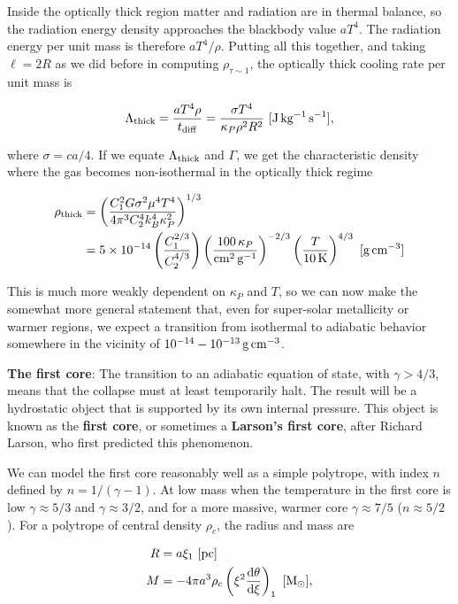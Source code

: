 \documentclass[a4paper,10pt]{article}
\begin{document}
{\noindent}Inside the optically thick region matter and radiation are in thermal balance, so the radiation energy density approaches the blackbody value $aT^4$. The radiation energy per unit mass is therefore $aT^4/\rho$. Putting all this together, and taking $\ell=2R$ as we did before in computing $\rho_{\tau\sim1}$, the optically thick cooling rate per unit mass is

\begin{align*}
    \Lambda_{\rm thick} = \frac{aT^4\rho}{t_{\rm diff}} = \frac{\sigma T^4}{\kappa_P\rho^2R^2} ~ [{\rm J\,kg^{-1}\,s^{-1}}],
\end{align*}

{\noindent}where $\sigma=ca/4$. If we equate $\Lambda_{\rm thick}$ and $\Gamma$, we get the characteristic density where the gas becomes non-isothermal in the optically thick regime

\begin{align*}
    \rho_{\rm thick} &= \left(\frac{C_1^2G\sigma^2\mu^4T^4}{4\pi^3C_2^4k_B^4\kappa_P^2}\right)^{1/3} \\
    &= 5\times10^{-14} \left(\frac{C_1^{2/3}}{C_2^{4/3}}\right) \left(\frac{100\,\kappa_P}{{\rm cm^2\,g^{-1}}}\right)^{-2/3} \left(\frac{T}{10\,{\rm K}}\right)^{4/3} ~ [{\rm g\,cm^{-3}}]
\end{align*}

{\noindent}This is much more weakly dependent on $\kappa_P$ and $T$, so we can now make the somewhat more general statement that, even for super-solar metallicity or warmer regions, we expect a transition from isothermal to adiabatic behavior somewhere in the vicinity of $10^{-14}-10^{-13}\,{\rm g\,cm^{-3}}$.

{\noindent}\textbf{The first core}: The transition to an adiabatic equation of state, with $\gamma>4/3$, means that the collapse must at least temporarily halt. The result will be a hydrostatic object that is supported by its own internal pressure. This object is known as the \textbf{first core}, or sometimes a \textbf{Larson's first core}, after Richard Larson, who first predicted this phenomenon.

{\noindent}We can model the first core reasonably well as a simple polytrope, with index $n$ defined by $n=1/(\gamma-1)$. At low mass when the temperature in the first core is low $\gamma\approx5/3$ and $\gamma\approx3/2$, and for a more massive, warmer core $\gamma\approx7/5$ ($n\approx5/2$). For a polytrope of central density $\rho_c$, the radius and mass are

\begin{align*}
    R &= a\xi_1 ~ [{\rm pc}]\\
    M &= -4\pi a^3\rho_c \left(\xi^2\frac{{\rm d}\theta}{{\rm d}\xi}\right)_1 ~ [{\rm M_\odot}],
\end{align*}
\end{document}
